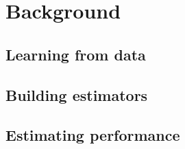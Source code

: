 \chapter{Background}\label{ch:background}

\section{Learning from data}

\section{Building estimators}

\section{Estimating performance}

\lipsum[1]
